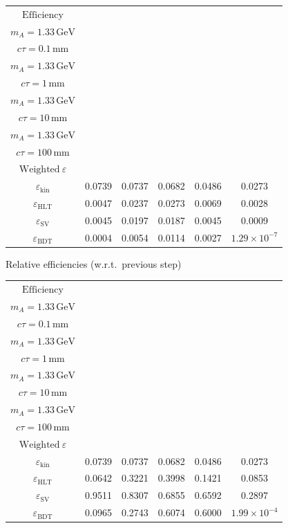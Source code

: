 \documentclass[10pt,a4paper]{article}
\begin{document}
{\begin{tabular}{cccccc}
\toprule
$\mathrm{Efficiency}$ & \shortstack{$m_{\pi}=4\,\mathrm{GeV}$\\$m_{A}=1.33\,\mathrm{GeV}$\\$c\tau=0.1\,\mathrm{mm}$} & \shortstack{$m_{\pi}=4\,\mathrm{GeV}$\\$m_{A}=1.33\,\mathrm{GeV}$\\$c\tau=1\,\mathrm{mm}$} & \shortstack{$m_{\pi}=4\,\mathrm{GeV}$\\$m_{A}=1.33\,\mathrm{GeV}$\\$c\tau=10\,\mathrm{mm}$} & \shortstack{$m_{\pi}=4\,\mathrm{GeV}$\\$m_{A}=1.33\,\mathrm{GeV}$\\$c\tau=100\,\mathrm{mm}$} & \shortstack{$\mathrm{QCD}$\\$\mathrm{Weighted}\ \varepsilon$} \\
\midrule
$\varepsilon_{\mathrm{kin}}$ & 0.0739 & 0.0737 & 0.0682 & 0.0486 & 0.0273\\
$\varepsilon_{\mathrm{HLT}}$ & 0.0047 & 0.0237 & 0.0273 & 0.0069 & 0.0028\\
$\varepsilon_{\mathrm{SV}}$ & 0.0045 & 0.0197 & 0.0187 & 0.0045 & 0.0009\\
$\varepsilon_{\mathrm{BDT}}$ & 0.0004 & 0.0054 & 0.0114 & 0.0027 & $1.29\times10^{-7}$\\
\bottomrule
\end{tabular}

\vspace{18pt}

Relative efficiencies (w.r.t.\ previous step)

\begin{tabular}{cccccc}
\toprule
$\mathrm{Efficiency}$ & \shortstack{$m_{\pi}=4\,\mathrm{GeV}$\\$m_{A}=1.33\,\mathrm{GeV}$\\$c\tau=0.1\,\mathrm{mm}$} & \shortstack{$m_{\pi}=4\,\mathrm{GeV}$\\$m_{A}=1.33\,\mathrm{GeV}$\\$c\tau=1\,\mathrm{mm}$} & \shortstack{$m_{\pi}=4\,\mathrm{GeV}$\\$m_{A}=1.33\,\mathrm{GeV}$\\$c\tau=10\,\mathrm{mm}$} & \shortstack{$m_{\pi}=4\,\mathrm{GeV}$\\$m_{A}=1.33\,\mathrm{GeV}$\\$c\tau=100\,\mathrm{mm}$} & \shortstack{$\mathrm{QCD}$\\$\mathrm{Weighted}\ \varepsilon$} \\
\midrule
$\varepsilon_{\mathrm{kin}}$ & 0.0739 & 0.0737 & 0.0682 & 0.0486 & 0.0273\\
$\varepsilon_{\mathrm{HLT}}$ & 0.0642 & 0.3221 & 0.3998 & 0.1421 & 0.0853\\
$\varepsilon_{\mathrm{SV}}$ & 0.9511 & 0.8307 & 0.6855 & 0.6592 & 0.2897\\
$\varepsilon_{\mathrm{BDT}}$ & 0.0965 & 0.2743 & 0.6074 & 0.6000 & $1.99\times10^{-4}$\\
\bottomrule
\end{tabular}

}
\end{document}
